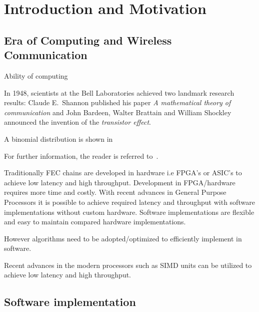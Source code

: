 \chapter{Introduction and Motivation} \label{chap:introduction}

\section{Era of Computing and Wireless Communication}
Ability of computing 




In 1948, scientists at the Bell Laboratories achieved two landmark research results:
Claude E.~Shannon published his paper \emph{A mathematical theory of communication} and John Bardeen, Walter Brattain and William Shockley announced the invention of the \emph{transistor effect}.

\cite{Arikan}

A binomial distribution is shown in %


For further information, the reader is referred to~\cite{Cover}.\newline

Traditionally FEC chains are developed in hardware i.e FPGA’s or ASIC’s to achieve low latency and high throughput.
Development in FPGA/hardware requires more time and costly.
With recent advances in General Purpose Processors it is possible to achieve required latency and throughput with software implementations without custom hardware.
Software implementations are flexible and easy to maintain compared hardware implementations.

However algorithms need to be adopted/optimized to efficiently implement in software.

Recent advances in the modern processors such as SIMD units can be utilized to achieve low latency and high throughput.

\section{Software implementation}



